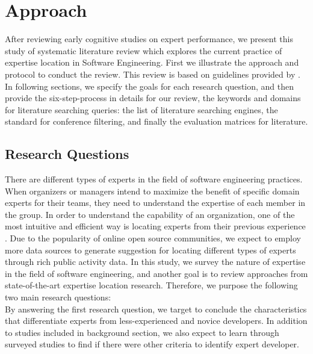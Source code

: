 \chapter{Approach}

After reviewing early cognitive studies on expert performance, we present this study of systematic literature review which explores the current practice of expertise location in Software Engineering. First we illustrate the approach and protocol to conduct the review. This review is based on guidelines provided by \citeauthor{KITCHENHAM20132049} \cite{KITCHENHAM20132049}. In following sections, we specify the goals for each research question, and then provide the six-step-process in details for our review, the keywords and domains for literature searching queries: the list of literature searching engines, the standard for conference filtering, and finally the evaluation matrices for literature.

\section{Research Questions}

There are different types of experts in the field of software engineering practices. When organizers or managers intend to maximize the benefit of specific domain experts for their teams, they need to understand the expertise of each member in the group. In order to understand the capability of an organization, one of the most intuitive and efficient way is locating experts from their previous experience \cite{mcdonald2000expertise}. Due to the popularity of online open source communities, we expect to employ more data sources to generate suggestion for locating different types of experts through rich public activity data. In this study, we survey the nature of expertise in the field of software engineering, and another goal is to review approaches from state-of-the-art expertise location research. Therefore, we purpose the following two main research questions:\\

\hfill\break
By answering the first research question, we target to conclude the characteristics that differentiate experts from less-experienced and novice developers. In addition to studies included in background section, we also expect to learn through surveyed studies to find if there were other criteria to identify expert developer.\\

